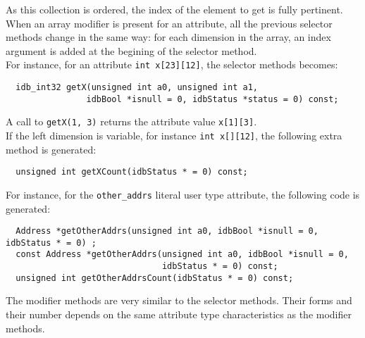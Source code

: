 As this collection is ordered, the index of the element to get is fully
pertinent.
\ee
{}
When an array modifier is present for an attribute, all the previous
selector methods change in the same way: for each dimension in the
array, an index argument is added at the begining of the selector method.
\\
For instance, for an attribute \texttt{int x[23][12]}, the selector methods
becomes:
\verbsize
\begin{verbatim}
  idb_int32 getX(unsigned int a0, unsigned int a1,
                idbBool *isnull = 0, idbStatus *status = 0) const;
\end{verbatim}
\normalsize
A call to \texttt{getX(1, 3)} returns the attribute value \texttt{x[1][3]}.
\\
If the left dimension is variable, for instance \texttt{int x[][12]},
the following extra method is generated:
\verbsize
\begin{verbatim}
  unsigned int getXCount(idbStatus * = 0) const;
\end{verbatim}
\normalsize
For instance,
for the \texttt{other\_addrs} literal user type attribute, the following
code is generated:
\verbsize
\begin{verbatim}
  Address *getOtherAddrs(unsigned int a0, idbBool *isnull = 0, idbStatus * = 0) ;
  const Address *getOtherAddrs(unsigned int a0, idbBool *isnull = 0,
                               idbStatus * = 0) const;
  unsigned int getOtherAddrsCount(idbStatus * = 0) const;
\end{verbatim}
\normalsize
%
The modifier methods are very similar to the selector methods.
Their forms and their number depends on the same attribute type characteristics
as the modifier methods.

